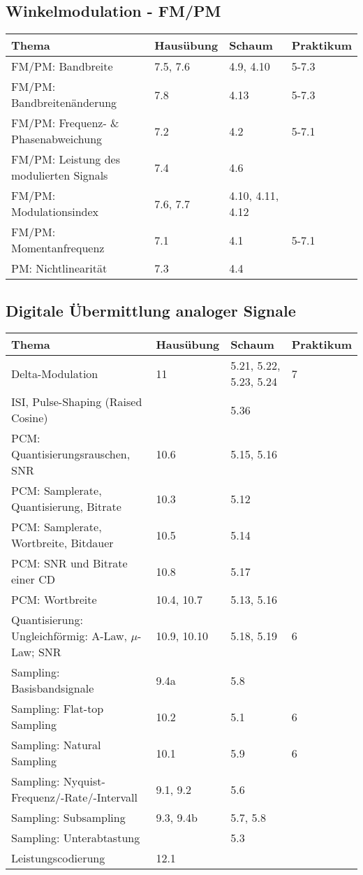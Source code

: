 \subsection{Winkelmodulation - FM/PM}
	\begin{tabular}{|p{9cm}|p{2.5cm}|p{3.5cm}|p{2cm}|}
	\hline
	\textbf{Thema} & \textbf{Hausübung} & \textbf{Schaum} & \textbf{Praktikum} \\ \hline
	FM/PM: Bandbreite & 7.5, 7.6 & 4.9, 4.10 & 5-7.3 \\ \hline
	FM/PM: Bandbreitenänderung & 7.8 & 4.13 & 5-7.3 \\ \hline
	FM/PM: Frequenz- \& Phasenabweichung & 7.2 & 4.2 & 5-7.1 \\ \hline
	FM/PM: Leistung des modulierten Signals & 7.4 & 4.6 &  \\ \hline
	FM/PM: Modulationsindex & 7.6, 7.7 & 4.10, 4.11, 4.12 &  \\ \hline
	FM/PM: Momentanfrequenz & 7.1 & 4.1 & 5-7.1 \\ \hline
	PM: Nichtlinearität & 7.3 & 4.4 &  \\ \hline
	\end{tabular}

\subsection{Digitale Übermittlung analoger Signale}
	\begin{tabular}{|p{9cm}|p{2.5cm}|p{3.5cm}|p{2cm}|}
	\hline
	\textbf{Thema} & \textbf{Hausübung} & \textbf{Schaum} & \textbf{Praktikum} \\ \hline
	Delta-Modulation & 11 & 5.21, 5.22, 5.23, 5.24 & 7 \\ \hline
	ISI, Pulse-Shaping (Raised Cosine) &  & 5.36 &  \\ \hline
	PCM: Quantisierungsrauschen, SNR & 10.6 & 5.15, 5.16 &  \\ \hline
	PCM: Samplerate, Quantisierung, Bitrate & 10.3 & 5.12 &  \\ \hline
	PCM: Samplerate, Wortbreite, Bitdauer & 10.5 & 5.14 &  \\ \hline
	PCM: SNR und Bitrate einer CD & 10.8 & 5.17 &  \\ \hline
	PCM: Wortbreite & 10.4, 10.7 & 5.13, 5.16 &  \\ \hline
	Quantisierung: Ungleichförmig: A-Law, $\mu$-Law; SNR & 10.9, 10.10 & 5.18, 5.19
	& 6 \\ \hline Sampling: Basisbandsignale & 9.4a & 5.8 &  \\ \hline
	Sampling: Flat-top Sampling & 10.2 & 5.1 & 6 \\ \hline
	Sampling: Natural Sampling & 10.1 & 5.9 & 6 \\ \hline
	Sampling: Nyquist-Frequenz/-Rate/-Intervall & 9.1, 9.2 & 5.6 &  \\ \hline
	Sampling: Subsampling & 9.3, 9.4b & 5.7, 5.8 &  \\ \hline
	Sampling: Unterabtastung & & 5.3 &  \\ \hline
	Leistungscodierung & 12.1 && \\ \hline
	\end{tabular}


